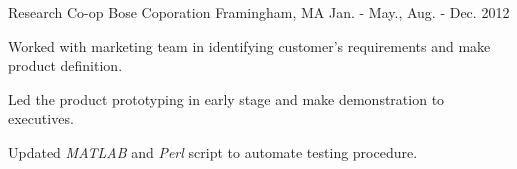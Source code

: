 \begin{cventries}
	\cventry
		{Research Co-op} %
		{Bose Coporation} %
		{Framingham, MA} %
		{Jan. - May., Aug. - Dec. 2012} %
		{
			\begin{cvitems} %
				\item {Worked with marketing team in identifying customer's requirements and make product definition.}
				\item {Led the product prototyping in early stage and make demonstration to executives.}
				\item {Updated \textit{MATLAB} and \textit{Perl} script to automate testing procedure.}
			\end{cvitems}
		}

\end{cventries}
